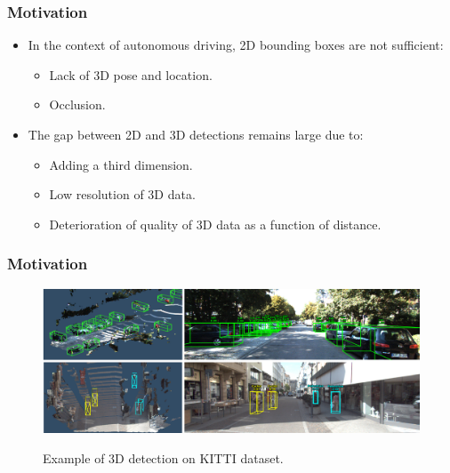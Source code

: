 \documentclass[10pt,fleqn,unknownkeysallowed]{beamer}
\begin{document}
\begin{frame}
	\frametitle{Motivation}
	\linespread{1.5}
	\begin{itemize}
		\item{In the context of autonomous driving, 2D bounding boxes are not sufficient:}
		\begin{itemize}
			\item{Lack of 3D pose and location.}
			\item{Occlusion.}
		\end{itemize}
		\item{The gap between 2D and 3D detections remains large due to:}
		\begin{itemize}
			\item{Adding a third dimension.}
			\item{Low resolution of 3D data.}
			\item {Deterioration of quality of 3D data as a function of distance.}
		\end{itemize}
	\end{itemize}
\end{frame}

\begin{frame}
	\frametitle{Motivation}
	\begin{figure}
		\begin{center}
			\includegraphics[width=1.0\textwidth]{images/Results_General}\\
			\caption{Example of 3D detection on KITTI dataset.}
		\end{center}
	\end{figure}
\end{frame}
\end{document}
